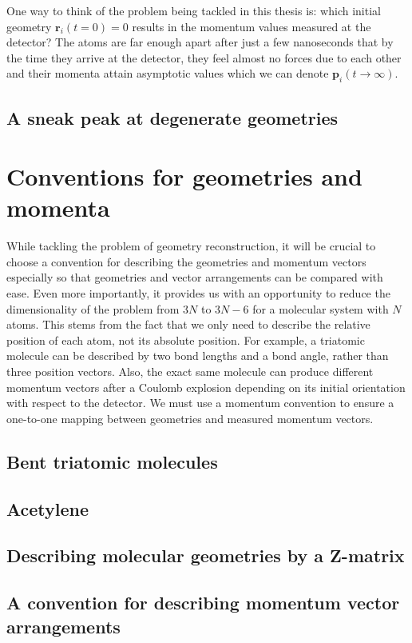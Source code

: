 One way to think of the problem being tackled in this thesis is: which initial geometry $\mathbf{r}_i(t=0) = 0$ results in the momentum values measured at the detector? The atoms are far enough apart after just a few nanoseconds that by the time they arrive at the detector, they feel almost no forces due to each other and their momenta attain asymptotic values which we can denote $\mathbf{p}_i(t\rightarrow\infty)$.

\subsection{A sneak peak at degenerate geometries}

\section{Conventions for geometries and momenta} \label{sec:conventions}
While tackling the problem of geometry reconstruction, it will be crucial to choose a convention for describing the geometries and momentum vectors especially so that geometries and vector arrangements can be compared with ease. Even more importantly, it provides us with an opportunity to reduce the dimensionality of the problem from $3N$ to $3N-6$ for a molecular system with $N$ atoms. This stems from the fact that we only need to describe the relative position of each atom, not its absolute position. For example, a triatomic molecule can be described by two bond lengths and a bond angle, rather than three position vectors. Also, the exact same molecule can produce different momentum vectors after a Coulomb explosion depending on its initial orientation with respect to the detector. We must use a momentum convention to ensure a one-to-one mapping between geometries and measured momentum vectors.

\subsection{Bent triatomic molecules}
\subsection{Acetylene}
\subsection{Describing molecular geometries by a Z-matrix}
\subsection{A convention for describing momentum vector arrangements}